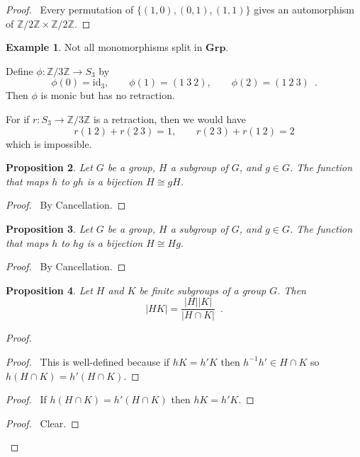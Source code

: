 \documentclass{book}
\let\qed\relax
\newtheorem{prop}{Proposition}[chapter]
\theoremstyle{definition}
\newtheorem{ex}[prop]{Example}
\newcommand{\Grp}{\ensuremath{\mathbf{Grp}}}
\newcommand{\id}[1]{\ensuremath{\mathrm{id}_{#1}}}
\newcommand{\inv}[1]{\ensuremath{{#1}^{-1}}}
\begin{document}
\begin{proof}
    \pf\ Every permutation of $\{ (1,0), (0,1), (1,1) \}$ gives an automorphism of $\mathbb{Z} / 2 \mathbb{Z} \times \mathbb{Z} / 2 \mathbb{Z}$. \qed
\end{proof}

\begin{ex}
Not all monomorphisms split in $\Grp$.

Define $\phi : \mathbb{Z} / 3 \mathbb{Z} \rightarrow S_3$ by
\[ \phi(0) = \id{3}, \qquad \phi(1) = (1 \ 3 \ 2), \qquad \phi(2) = (1 \ 2 \ 3) \enspace . \]
Then $\phi$ is monic but has no retraction.

For if $r : S_3 \rightarrow \mathbb{Z} / 3 \mathbb{Z}$ is a retraction, then we would have
\[ r(1\ 2) + r(2\ 3) = 1, \qquad r(2\ 3) + r(1\ 2) = 2 \]
which is impossible.
\end{ex}

\begin{prop}
Let $G$ be a group, $H$ a subgroup of $G$, and $g \in G$. The function that maps $h$ to $gh$ is a bijection $H \cong gH$.
\end{prop}

\begin{proof}
\pf\ By Cancellation. \qed
\end{proof}

\begin{prop}
Let $G$ be a group, $H$ a subgroup of $G$, and $g \in G$. The function that maps $h$ to $hg$ is a bijection $H \cong Hg$.
\end{prop}

\begin{proof}
\pf\ By Cancellation. \qed
\end{proof}

\begin{prop}
\label{prop:order-of-HK}
Let $H$ and $K$ be finite subgroups of a group $G$. Then
\[ |HK| = \frac{|H||K|}{|H \cap K|} \enspace . \]
\end{prop}

\begin{proof}
\pf
{}
\begin{proof}
	\pf\ This is well-defined because if $hK = h'K$ then $\inv{h} h' \in H \cap K$ so $h(H \cap K) = h'(H \cap K)$.
\end{proof}
\begin{proof}
	\pf\ If $h(H \cap K) = h'(H \cap K)$ then $hK = h'K$.
\end{proof}
\begin{proof}
	\pf\ Clear.
\end{proof}
\qed
\end{proof}
\end{document}
